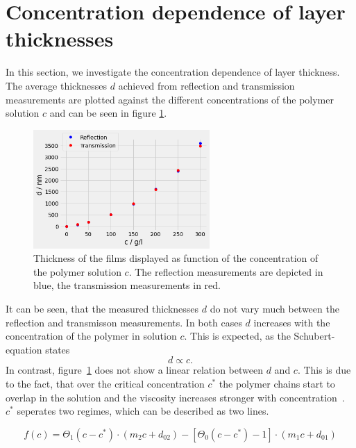 \section{Concentration dependence of layer thicknesses}
\label{sec:rot}

In this section, we investigate the concentration dependence of layer thickness. The average thicknesses $d$ achieved from reflection and transmission measurements are plotted against the different concentrations of the polymer solution $c$ and can be seen in figure \ref{fig:ConcReflTrans}.


\begin{figure}[ht]
    \centering
    \includegraphics[width = 0.6\textwidth]{Bilder/Auswertung/Concentration/PlotReflTrans.png}
    \caption{Thickness of the films displayed as function of the concentration of the polymer solution $c$. The reflection measurements are depicted in blue, the transmission measurements in red.}
    \label{fig:ConcReflTrans}
\end{figure}

It can be seen, that the measured thicknesses $d$ do not vary much between the reflection and transmisson measurements. In both cases $d$ increases with the concentration of the polymer in solution $c$. This is expected, as the Schubert-equation states
\begin{equation}
    d \varpropto c.
\end{equation}
In contrast, figure~\ref{fig:ConcReflTrans} does not show a linear relation between $d$ and $c$. This is due to the fact, that over the critical concentration $c^*$ the polymer chains start to overlap in the solution and the viscosity increases stronger with concentration~\cite{Ruderer.2009}. $c^*$ seperates two regimes, which can be described as two lines.

\begin{equation}
    f(c) = \Theta_1(c - c^*) \cdot (m_2c + d_{02}) - [\Theta_0(c - c^*)-1] \cdot (m_1c+d_{01})
    \label{eq:twoLines}
\end{equation}

